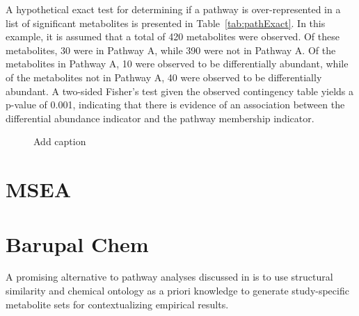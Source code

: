 A hypothetical exact test for determining if a pathway is over-represented in a list of significant metabolites is presented in Table~\ref{tab:pathExact}. In this example, it is assumed that a total of 420 metabolites were observed. Of these metabolites, 30 were in Pathway A, while 390 were not in Pathway A. Of the metabolites in Pathway A, 10 were observed to be differentially abundant, while of the metabolites not in Pathway A, 40 were observed to be differentially abundant. A two-sided Fisher's test given the observed contingency table yields a p-value of 0.001, indicating that there is evidence of an association between the differential abundance indicator and the pathway membership indicator. 

\begin{figure}[ht]
	\caption[Add caption]{Add caption \label{fig:vennHell} }
\end{figure}

\section{MSEA}

\section{Barupal Chem}
A promising alternative to pathway analyses discussed in \cite{barupal2017} is to use structural similarity and chemical ontology as a priori knowledge to generate study-specific metabolite sets for contextualizing empirical results. 

